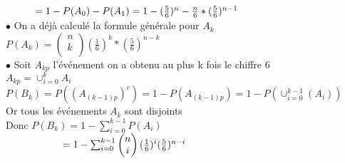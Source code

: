 \documentclass{article}
\newcommand\tab[1][1cm]{\hspace*{#1}}
\begin{document}
$\tab = 1 - P(A_0) - P(A_1) = 1 - (\frac{5}{6})^n - \frac{n}{6} * (\frac{5}{6})^{n - 1}$\\
$\bullet$ On a déjà calculé la formule générale pour $A_k$\\
$P(A_k) = \begin{pmatrix}
    n\\
    k\\
\end{pmatrix} (\frac{1}{6})^k * (\frac{5}{6})^{n - k}$\\
\newpage
\noindent $\bullet$ Soit $A_{kp}$ l'événement on a obtenu au plus k fois le chiffre 6\\
$A_{kp} = \cup_{i=0}^{k} A_i$\\
$P(B_k) = P((A_{(k - 1)p})^c) = 1 - P(A_{(k - 1)p})  = 1 - P(\cup_{i=0}^{k-1} (A_i))$\\
Or tous les événements $A_k$ sont disjoints\\
Donc $P(B_k) = 1 - \sum_{i=0}^{k-1} P(A_i)$\\
$\tab[2cm] = 1 - \sum_{i=0}^{k-1} \begin{pmatrix}
    n\\
    i\\
\end{pmatrix} (\frac{1}{6})^i (\frac{5}{6})^{n - i}$
\end{document}
